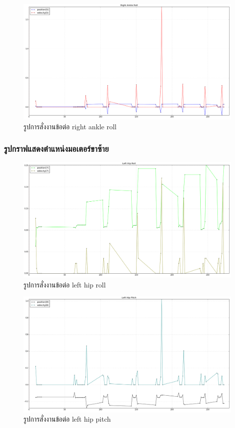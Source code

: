 \begin{figure}[!ht]
  \centering
  \includegraphics[width=1.0\linewidth]{chapter4/images/right_ankle_roll.png}
  \caption{รูปการสั่งงานข้อต่อ right ankle roll}
  \label{fig:right_ankle_roll}
\end{figure} 
\clearpage
  
\subsubsection*{รูปกราฟแสดงตำแหน่งมอเตอร์ขาซ้าย}
\begin{figure}[!ht]
  \centering
  \includegraphics[width=1.0\linewidth]{chapter4/images/left_hip_roll.png}
  \caption{รูปการสั่งงานข้อต่อ left hip roll}
  \label{fig:left_hip_roll}
\end{figure}

\begin{figure}[!ht]
  \centering
  \includegraphics[width=1.0\linewidth]{chapter4/images/left_hip_pitch.png}
  \caption{รูปการสั่งงานข้อต่อ left hip pitch}
  \label{fig:left_hip_pitch}
\end{figure}
\clearpage


